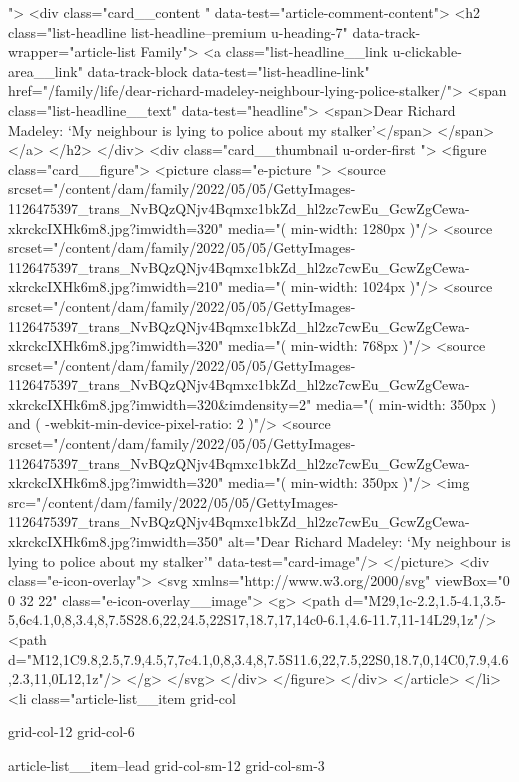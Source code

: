 {{{			
			 ">
<div class="card__content " data-test="article-comment-content">
<h2 class="list-headline list-headline--premium u-heading-7" data-track-wrapper="article-list Family">
<a class="list-headline__link u-clickable-area__link" data-track-block data-test="list-headline-link" href="/family/life/dear-richard-madeley-neighbour-lying-police-stalker/">
<span class="list-headline__text" data-test="headline">
<span>Dear Richard Madeley: ‘My neighbour is lying to police about my stalker’</span>
</span>
</a>
</h2>
</div>
<div class="card__thumbnail u-order-first ">
<figure class="card__figure">
<picture class="e-picture   ">
<source srcset="/content/dam/family/2022/05/05/GettyImages-1126475397_trans_NvBQzQNjv4Bqmxc1bkZd_hl2zc7cwEu_GcwZgCewa-xkrckcIXHk6m8.jpg?imwidth=320" media="( min-width: 1280px )"/>
<source srcset="/content/dam/family/2022/05/05/GettyImages-1126475397_trans_NvBQzQNjv4Bqmxc1bkZd_hl2zc7cwEu_GcwZgCewa-xkrckcIXHk6m8.jpg?imwidth=210" media="( min-width: 1024px )"/>
<source srcset="/content/dam/family/2022/05/05/GettyImages-1126475397_trans_NvBQzQNjv4Bqmxc1bkZd_hl2zc7cwEu_GcwZgCewa-xkrckcIXHk6m8.jpg?imwidth=320" media="( min-width: 768px )"/>
<source srcset="/content/dam/family/2022/05/05/GettyImages-1126475397_trans_NvBQzQNjv4Bqmxc1bkZd_hl2zc7cwEu_GcwZgCewa-xkrckcIXHk6m8.jpg?imwidth=320&imdensity=2" media="( min-width: 350px ) and ( -webkit-min-device-pixel-ratio: 2 )"/>
<source srcset="/content/dam/family/2022/05/05/GettyImages-1126475397_trans_NvBQzQNjv4Bqmxc1bkZd_hl2zc7cwEu_GcwZgCewa-xkrckcIXHk6m8.jpg?imwidth=320" media="( min-width: 350px )"/>
<img src="/content/dam/family/2022/05/05/GettyImages-1126475397_trans_NvBQzQNjv4Bqmxc1bkZd_hl2zc7cwEu_GcwZgCewa-xkrckcIXHk6m8.jpg?imwidth=350" alt="Dear Richard Madeley: ‘My neighbour is lying to police about my stalker’" data-test="card-image"/>
</picture>
<div class="e-icon-overlay">
<svg xmlns="http://www.w3.org/2000/svg" viewBox="0 0 32 22" class="e-icon-overlay__image">
<g>
<path d="M29,1c-2.2,1.5-4.1,3.5-5,6c4.1,0,8,3.4,8,7.5S28.6,22,24.5,22S17,18.7,17,14c0-6.1,4.6-11.7,11-14L29,1z"/>
<path d="M12,1C9.8,2.5,7.9,4.5,7,7c4.1,0,8,3.4,8,7.5S11.6,22,7.5,22S0,18.7,0,14C0,7.9,4.6,2.3,11,0L12,1z"/>
</g>
</svg>
</div>
</figure>
</div>
</article>
</li>
<li class="article-list__item
				grid-col
				
				
				
				grid-col-12
				grid-col-6
				
				
				
				
				article-list__item--lead grid-col-sm-12
				grid-col-sm-3
				
}}}
